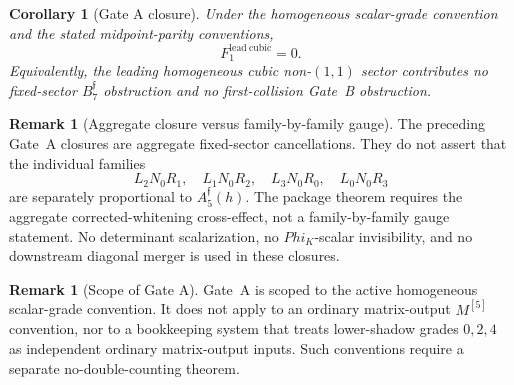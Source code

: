 \documentclass[11pt,a4paper]{amsart}
\def\Phi{Phi}%
\theoremstyle{plain}
\newtheorem{corollary}[theorem]{Corollary}
\theoremstyle{definition}
\newtheorem{remark}[theorem]{Remark}
\begin{document}
\begin{corollary}[Gate A closure]
\label{cor:gate-a-closure}
Under the homogeneous scalar-grade convention and the stated
midpoint-parity conventions,
\[
F_1^{\mathrm{lead\ cubic}}=0.
\]
Equivalently, the leading homogeneous cubic non-\((1,1)\) sector
contributes no fixed-sector \(B_7^{\mathfrak f}\) obstruction and no
first-collision Gate~B obstruction.
\end{corollary}

\begin{remark}[Aggregate closure versus family-by-family gauge]
\label{rem:aggregate-closure-versus-family-by-family-gauge}
The preceding Gate~A closures are aggregate fixed-sector cancellations.
They do not assert that the individual families
\[
L_2N_0R_1,\quad L_1N_0R_2,\quad L_3N_0R_0,\quad L_0N_0R_3
\]
are separately proportional to \(A_5^{\mathfrak f}(h)\).  The package
theorem requires the aggregate corrected-whitening cross-effect, not a
family-by-family gauge statement.  No determinant scalarization, no
\(\Phi_K\)-scalar invisibility, and no downstream diagonal merger is used
in these closures.
\end{remark}

\begin{remark}[Scope of Gate A]
\label{rem:scope-of-gate-a}
Gate~A is scoped to the active homogeneous scalar-grade convention.  It
does not apply to an ordinary matrix-output \(M^{[5]}\) convention, nor to
a bookkeeping system that treats lower-shadow grades \(0,2,4\) as
independent ordinary matrix-output inputs.  Such conventions require a
separate no-double-counting theorem.
\end{remark}
\end{document}
